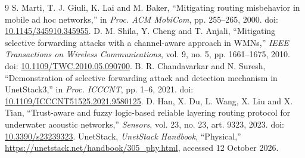 \documentclass{article}
\begin{document}
\begin{thebibliography}{9}\small
{} S. Marti, T. J. Giuli, K. Lai and M. Baker, ``Mitigating routing misbehavior in mobile ad hoc networks,'' in \emph{Proc. ACM MobiCom}, pp. 255--265, 2000. doi: \href{https://doi.org/10.1145/345910.345955}{10.1145/345910.345955}.
 D. M. Shila, Y. Cheng and T. Anjali, ``Mitigating selective forwarding attacks with a channel-aware approach in WMNs,'' \emph{IEEE Transactions on Wireless Communications}, vol. 9, no. 5, pp. 1661--1675, 2010. doi: \href{https://doi.org/10.1109/TWC.2010.05.090700}{10.1109/TWC.2010.05.090700}.
 B. R. Chandavarkar and N. Suresh, ``Demonstration of selective forwarding attack and detection mechanism in UnetStack3,'' in \emph{Proc. ICCCNT}, pp. 1--6, 2021. doi: \href{https://doi.org/10.1109/ICCCNT51525.2021.9580125}{10.1109/ICCCNT51525.2021.9580125}.
 D. Han, X. Du, L. Wang, X. Liu and X. Tian, ``Trust-aware and fuzzy logic-based reliable layering routing protocol for underwater acoustic networks,'' \emph{Sensors}, vol. 23, no. 23, art. 9323, 2023. doi: \href{https://doi.org/10.3390/s23239323}{10.3390/s23239323}.
 UnetStack, \emph{UnetStack Handbook}, ``Physical,'' \url{https://unetstack.net/handbook/305_phy.html}, accessed 12 October 2026.
\end{thebibliography}
\end{document}

